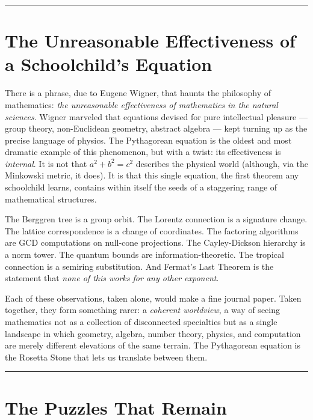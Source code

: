 \documentclass[11pt,openany]{book}
\theoremstyle{definition}
\theoremstyle{plain}
\theoremstyle{remark}
\begin{document}
\bigskip\noindent\rule{\textwidth}{0.4pt}\bigskip


\section*{The Unreasonable Effectiveness of a Schoolchild's Equation}


There is a phrase, due to Eugene Wigner, that haunts the philosophy of mathematics: \textit{the unreasonable effectiveness of mathematics in the natural sciences}. Wigner marveled that equations devised for pure intellectual pleasure — group theory, non-Euclidean geometry, abstract algebra — kept turning up as the precise language of physics. The Pythagorean equation is the oldest and most dramatic example of this phenomenon, but with a twist: its effectiveness is \textit{internal}. It is not that $a^2 + b^2 = c^2$ describes the physical world (although, via the Minkowski metric, it does). It is that this single equation, the first theorem any schoolchild learns, contains within itself the seeds of a staggering range of mathematical structures.

The Berggren tree is a group orbit. The Lorentz connection is a signature change. The lattice correspondence is a change of coordinates. The factoring algorithms are GCD computations on null-cone projections. The Cayley-Dickson hierarchy is a norm tower. The quantum bounds are information-theoretic. The tropical connection is a semiring substitution. And Fermat's Last Theorem is the statement that \textit{none of this works for any other exponent}.

Each of these observations, taken alone, would make a fine journal paper. Taken together, they form something rarer: a \textit{coherent worldview}, a way of seeing mathematics not as a collection of disconnected specialties but as a single landscape in which geometry, algebra, number theory, physics, and computation are merely different elevations of the same terrain. The Pythagorean equation is the Rosetta Stone that lets us translate between them.

\bigskip\noindent\rule{\textwidth}{0.4pt}\bigskip


\section*{The Puzzles That Remain}
\end{document}
